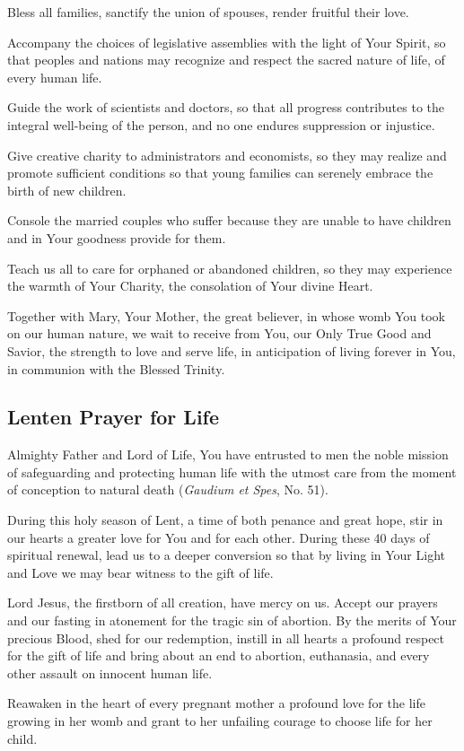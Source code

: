 \documentclass[12pt]{article}
\newcommand{\prayertitle}[1]{\subsection{#1}}
\begin{document}
Bless all families, sanctify the union of spouses, render fruitful their love.

Accompany the choices of legislative assemblies with the light of Your Spirit, so that peoples and nations may recognize and respect the sacred nature of life, of every human life.

Guide the work of scientists and doctors, so that all progress contributes to the integral well-being of the person, and no one endures suppression or injustice.

Give creative charity to administrators and economists, so they may realize and promote sufficient conditions so that young families can serenely embrace the birth of new children.

Console the married couples who suffer because they are unable to have children and in Your goodness provide for them.

Teach us all to care for orphaned or abandoned children, so they may experience the warmth of Your Charity, the consolation of Your divine Heart.

Together with Mary, Your Mother, the great believer, in whose womb You took on our human nature, we wait to receive from You, our Only True Good and Savior, the strength to love and serve life, in anticipation of living forever in You, in communion with the Blessed Trinity.

\prayertitle{Lenten Prayer for Life}
Almighty Father and Lord of Life,
You have entrusted to men the noble mission of safeguarding and protecting human life with the utmost care from the moment of conception to natural death (\textit{Gaudium et Spes}, No. 51).

During this holy season of Lent, a time of both penance and great hope, stir in our hearts a greater love for You and for each other.
During these 40 days of spiritual renewal, lead us to a deeper conversion so that by living in Your Light and Love we may bear witness to the gift of life.

Lord Jesus, the firstborn of all creation, have mercy on us. 
Accept our prayers and our fasting in atonement for the tragic sin of abortion. 
By the merits of Your precious Blood, shed for our redemption, instill in all hearts a profound respect for the gift of life and bring about an end to abortion, euthanasia, and every other assault on innocent human life.

Reawaken in the heart of every pregnant mother a profound love for the life growing in her womb and grant to her unfailing courage to choose life for her child.
\end{document}
